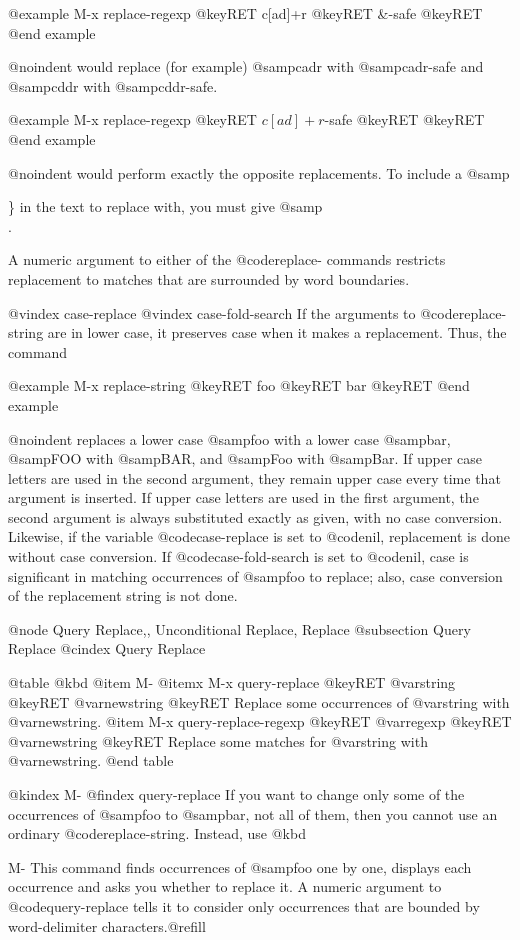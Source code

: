 {{{{{{{{{{{{{{{{{@example
M-x replace-regexp @key{RET} c[ad]+r @key{RET} \&-safe @key{RET}
@end example

@noindent
would replace (for example) @samp{cadr} with @samp{cadr-safe} and @samp{cddr}
with @samp{cddr-safe}.

@example
M-x replace-regexp @key{RET} \(c[ad]+r\)-safe @key{RET} \1 @key{RET}
@end example

@noindent
would perform exactly the opposite replacements.  To include a @samp{\}
in the text to replace with, you must give @samp{\\}.

  A numeric argument to either of the @code{replace-} commands restricts
replacement to matches that are surrounded by word boundaries.

@vindex case-replace
@vindex case-fold-search
  If the arguments to @code{replace-string} are in lower case, it preserves
case when it makes a replacement.  Thus, the command

@example
M-x replace-string @key{RET} foo @key{RET} bar @key{RET}
@end example

@noindent
replaces a lower case @samp{foo} with a lower case @samp{bar}, @samp{FOO}
with @samp{BAR}, and @samp{Foo} with @samp{Bar}.  If upper case letters are
used in the second argument, they remain upper case every time that
argument is inserted.  If upper case letters are used in the first
argument, the second argument is always substituted exactly as given, with
no case conversion.  Likewise, if the variable @code{case-replace} is set
to @code{nil}, replacement is done without case conversion.  If
@code{case-fold-search} is set to @code{nil}, case is significant in
matching occurrences of @samp{foo} to replace; also, case conversion of the
replacement string is not done.

@node Query Replace,, Unconditional Replace, Replace
@subsection Query Replace
@cindex Query Replace

@table @kbd
@item M-%
@itemx M-x query-replace @key{RET} @var{string} @key{RET} @var{newstring} @key{RET}
Replace some occurrences of @var{string} with @var{newstring}.
@item M-x query-replace-regexp @key{RET} @var{regexp} @key{RET} @var{newstring} @key{RET}
Replace some matches for @var{string} with @var{newstring}.
@end table

@kindex M-%
@findex query-replace
  If you want to change only some of the occurrences of @samp{foo} to
@samp{bar}, not all of them, then you cannot use an ordinary
@code{replace-string}.  Instead, use @kbd{M-%
This command finds occurrences of @samp{foo} one by one, displays each
occurrence and asks you whether to replace it.  A numeric argument to
@code{query-replace} tells it to consider only occurrences that are bounded
by word-delimiter characters.@refill

}}}}}}}}}}}}}}}}}}}
